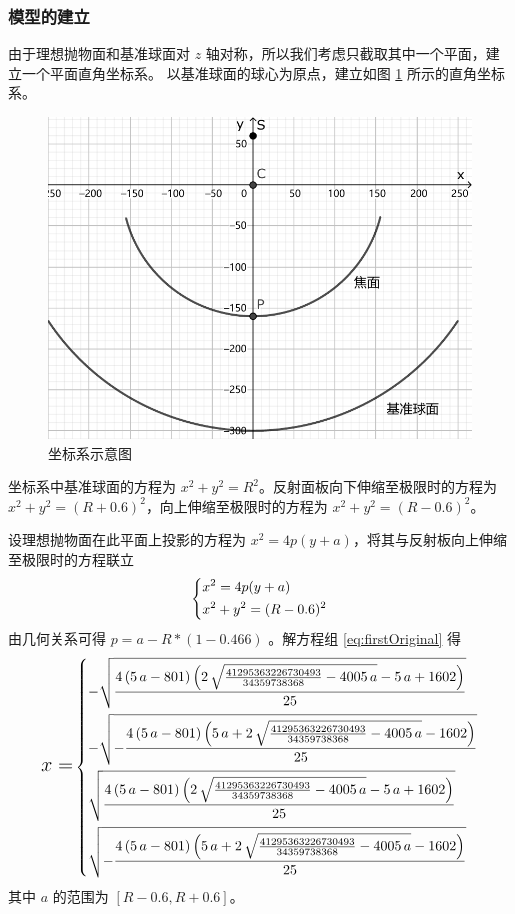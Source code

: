 \documentclass[withoutpreface,bwprint]{cumcmthesis} %
\begin{document}
\subsubsection{模型的建立}
由于理想抛物面和基准球面对 $z$ 轴对称，所以我们考虑只截取其中一个平面，建立一个平面直角坐标系。
以基准球面的球心为原点，建立如图 \ref{fig:coordinate1} 所示的直角坐标系。
\begin{figure}[!h]
    \centering
    \includegraphics[width=.45\textwidth]{CoordinateSystem1.pdf}
    \caption{坐标系示意图}
    \label{fig:coordinate1}
\end{figure}
坐标系中基准球面的方程为 $x^2 + y^2 = R^2$。反射面板向下伸缩至极限时的方程为
$x^2 + y^2 = (R + 0.6)^2$，向上伸缩至极限时的方程为 $x^2 + y^2 = (R - 0.6)^2$。

设理想抛物面在此平面上投影的方程为 $x^2 = 4p(y + a)$，将其与反射板向上伸缩至极限时的方程联立
\begin{equation}
    \label{eq:firstOriginal}
    \begin{dcases}
        x^2 = 4p(y + a) \\
        x^2 + y^2 = (R - 0.6)^2
    \end{dcases}
\end{equation}
由几何关系可得 $p = a - R * (1 - 0.466)$ 。解方程组 \ref{eq:firstOriginal} 得
\[
    \text{\Large $x =$}
    \begin{dcases}
        -\sqrt{\frac{4\,{\left(5\,a-801\right)}\,{\left(2\,\sqrt{\frac{41295363226730493}
        {34359738368}-4005\,a}-5\,a+1602\right)}}{25}}                    \\
        -\sqrt{-\frac{4\,{\left(5\,a-801\right)}\,{\left(5\,a+2\,\sqrt{
        \frac{41295363226730493}{34359738368}-4005\,a}-1602\right)}}{25}} \\
        \sqrt{\frac{4\,{\left(5\,a-801\right)}\,{\left(2\,\sqrt{\frac{41295363226730493}
        {34359738368}-4005\,a}-5\,a+1602\right)}}{25}}                    \\
        \sqrt{-\frac{4\,{\left(5\,a-801\right)}\,{\left(5\,a+2\,\sqrt{
        \frac{41295363226730493}{34359738368}-4005\,a}-1602\right)}}{25}}
    \end{dcases}
\]
其中 $a$ 的范围为 $\left[R - 0.6, R + 0.6\right]$。
\end{document}
